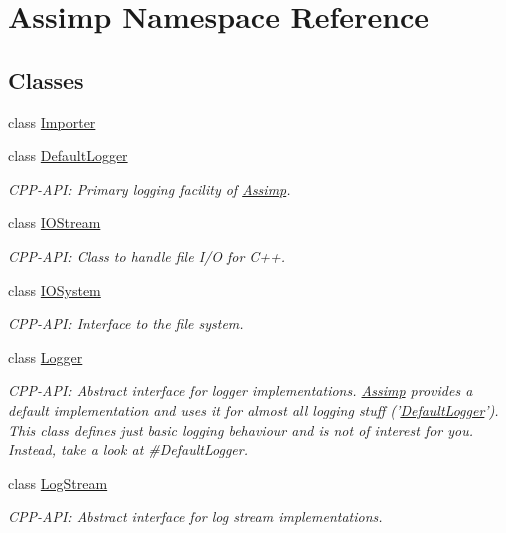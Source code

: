 \hypertarget{namespace_assimp}{\section{Assimp Namespace Reference}
\label{namespace_assimp}
}
\subsection*{Classes}
\begin{DoxyCompactItemize}
\item 
class \hyperlink{class_assimp_1_1_importer}{Importer}
\item 
class \hyperlink{class_assimp_1_1_default_logger}{Default\-Logger}
\begin{DoxyCompactList}\small\item\em C\-P\-P-\/\-A\-P\-I\-: Primary logging facility of \hyperlink{namespace_assimp}{Assimp}. \end{DoxyCompactList}\item 
class \hyperlink{class_assimp_1_1_i_o_stream}{I\-O\-Stream}
\begin{DoxyCompactList}\small\item\em C\-P\-P-\/\-A\-P\-I\-: Class to handle file I/\-O for C++. \end{DoxyCompactList}\item 
class \hyperlink{class_assimp_1_1_i_o_system}{I\-O\-System}
\begin{DoxyCompactList}\small\item\em C\-P\-P-\/\-A\-P\-I\-: Interface to the file system. \end{DoxyCompactList}\item 
class \hyperlink{class_assimp_1_1_logger}{Logger}
\begin{DoxyCompactList}\small\item\em C\-P\-P-\/\-A\-P\-I\-: Abstract interface for logger implementations. \hyperlink{namespace_assimp}{Assimp} provides a default implementation and uses it for almost all logging stuff ('\hyperlink{class_assimp_1_1_default_logger}{Default\-Logger}'). This class defines just basic logging behaviour and is not of interest for you. Instead, take a look at \#\-Default\-Logger. \end{DoxyCompactList}\item 
class \hyperlink{class_assimp_1_1_log_stream}{Log\-Stream}
\begin{DoxyCompactList}\small\item\em C\-P\-P-\/\-A\-P\-I\-: Abstract interface for log stream implementations. \end{DoxyCompactList}\item 

\end{DoxyCompactItemize}
